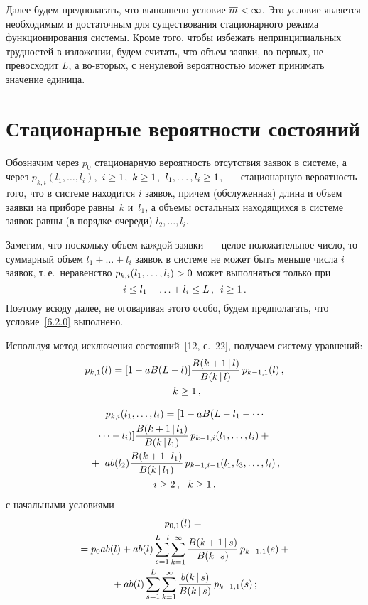 \begin{multicols}{2}
Далее будем предполагать, что выполнено условие
$\overline m \hm< \infty$.
Это условие является необходимым и достаточным для
существования стационарного режима функционирования
сис\-те\-мы. Кроме того, чтобы избежать непринципиальных
трудностей в изложении, будем считать, что объем заявки,
во-пер\-вых, не превосходит $L$, а во-вто\-рых, с ненулевой
вероятностью может принимать значение единица.

\section{Стационарные вероятности состояний}

Обозначим через $p_0$ стационарную вероятность
отсутствия заявок в сис\-те\-ме, а через
$p_{k,i}(l_1,\ldots,l_i)$,\ 
$i \hm\ge 1$,\  $k\hm\ge 1$,\  $l_1,\ldots,l_i \hm\ge 1$,~---
стационарную вероятность того, что в сис\-те\-ме находится
$i$ заявок, причем (обслуженная) длина и объем заявки
на приборе равны~$k$ и~$l_1$, а объемы остальных
находящихся в сис\-те\-ме заявок равны (в порядке очереди)
$l_2,\ldots,l_i$.

Заметим, что поскольку объем каждой заявки~---
целое положительное чис\-ло, то
суммарный объем $l_1 +\ldots+ l_i$ заявок в системе
не может быть меньше числа $i$ заявок, т.\,е.\
неравенство $p_{k,i}(l_1,\ldots,l_i) \hm> 0$
может выполняться только при
\begin{equation}
\label{6.2.0}
i\le l_1 +\ldots+ l_i \le L
\,,\enskip i \ge 1\,.
\end{equation}
Поэтому всюду далее, не оговаривая этого особо, будем
предполагать, что условие~\eqref{6.2.0} выполнено.

Используя метод исключения состояний~[12, с.~22],
получаем сис\-те\-му урав\-нений:
\begin{multline}
\label{6.2.1}
p_{k,1}(l)
=
[1 - a B(L-l)]
\displaystyle\frac{\displaystyle B(k+1\,|\,l)\mathstrut}{\displaystyle B(k\,|\,l)\mathstrut}
\,p_{k-1,1}(l)\,,\\
\enskip k\ge 1\,,
\end{multline}

\vspace*{-9pt}

\noindent
\begin{multline}
p_{k,i}(l_1,\ldots,l_i)
=
[1 - a B(L-l_1-\cdots\\
\cdots -l_i)]
\displaystyle\frac{\displaystyle B(k+1\,|\,l_1)\mathstrut}{\displaystyle B(k\,|\,l_1)\mathstrut}
\,p_{k-1,i}(l_1,\ldots,l_i)
 +{}\\
{}
+\
a b(l_2)
\displaystyle\frac{\displaystyle B(k+1\,|\,l_1)\mathstrut}{\displaystyle  B(k\,|\,l_1)\mathstrut}
\,p_{k-1,i-1}(l_1,l_3,\ldots,l_i)\,,
\\
i \ge 2\,,\ \  k\ge 1\,,
\label{6.2.2}
\end{multline}
с начальными условиями
\begin{multline}
\label{6.2.3}
p_{0,1}(l)
={}\\
{}=p_0 a b(l)
+a b(l)\sum\limits_{s=1}^{L-l}
\sum\limits_{k=1}^\infty
\displaystyle\frac{\displaystyle B(k+1\,|\,s) \mathstrut}{\displaystyle B(k\,|\,s)\mathstrut}\, p_{k-1,1}(s)
+{}\\
{}+
a b(l)
\sum\limits_{s=1}^{L}
\sum\limits_{k=1}^\infty
\displaystyle\frac{\displaystyle b(k\,|\,s)\mathstrut}{\displaystyle  B(k\,|\,s)\mathstrut}\, p_{k-1,1}(s)\,;
\end{multline}


\end{multicols}
